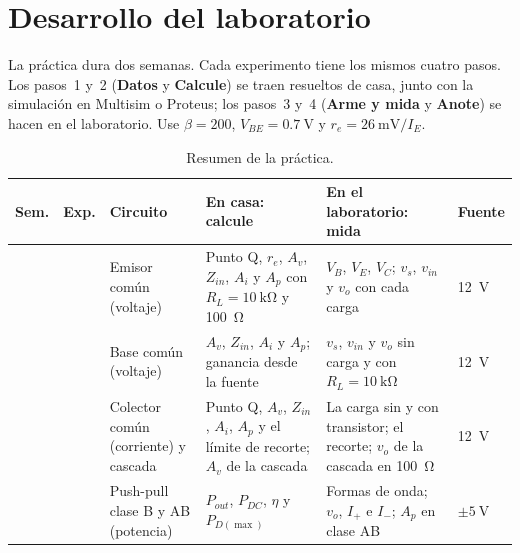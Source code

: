 \documentclass[11pt,a4paper]{article}
\let\needspace\Needspace
\begin{document}
\FloatBarrier
\needspace{14\baselineskip}
\section{Desarrollo del laboratorio}
La práctica dura dos semanas. Cada experimento tiene los mismos cuatro pasos. Los pasos~1 y~2
(\textbf{Datos} y \textbf{Calcule}) se traen resueltos de casa, junto con la simulación en
Multisim o Proteus; los pasos~3 y~4 (\textbf{Arme y mida} y \textbf{Anote}) se hacen en el
laboratorio. Use $\beta = 200$, $V_{BE} = \qty{0.7}{\volt}$ y
$r_e = \qty{26}{\milli\volt}/I_E$.

\begin{table}[H]
  \centering
  \renewcommand{\arraystretch}{1.35}
  \begin{tabularx}{\linewidth}{|>{\centering\arraybackslash}m{1.1cm}|>{\centering\arraybackslash}m{0.8cm}|>{\raggedright\arraybackslash}m{2.7cm}|>{\raggedright\arraybackslash}X|>{\raggedright\arraybackslash}X|>{\centering\arraybackslash}m{1.3cm}|}
    \hline
    \textbf{Sem.} & \textbf{Exp.} & \textbf{Circuito} & \textbf{En casa: calcule}
      & \textbf{En el laboratorio: mida} & \textbf{Fuente} \\ \hline
    \multirow{2}{*}{1} & 1 & Emisor común (voltaje)
      & Punto Q, $r_e$, $A_v$, $Z_{in}$, $A_i$ y $A_p$ con $R_L = \qty{10}{\kilo\ohm}$ y
        \qty{100}{\ohm}
      & $V_B$, $V_E$, $V_C$; $v_s$, $v_{in}$ y $v_o$ con cada carga
      & \qty{+12}{\volt} \\ \cline{2-6}
    & 2 & Base común (voltaje)
      & $A_v$, $Z_{in}$, $A_i$ y $A_p$; ganancia desde la fuente
      & $v_s$, $v_{in}$ y $v_o$ sin carga y con $R_L = \qty{10}{\kilo\ohm}$
      & \qty{+12}{\volt} \\ \hline
    \multirow{2}{*}{2} & 3 & Colector común (corriente) y cascada
      & Punto Q, $A_v$, $Z_{in}$, $A_i$, $A_p$ y el límite de recorte; $A_v$ de la cascada
      & La carga sin y con transistor; el recorte; $v_o$ de la cascada en \qty{100}{\ohm}
      & \qty{+12}{\volt} \\ \cline{2-6}
    & 4 & Push-pull clase B y AB (potencia)
      & $P_{out}$, $P_{DC}$, $\eta$ y $P_{D(\max)}$
      & Formas de onda; $v_o$, $I_+$ e $I_-$; $A_p$ en clase AB
      & $\pm\qty{5}{\volt}$ \\ \hline
  \end{tabularx}
  \caption{Resumen de la práctica.}
  \label{tab:resumen}
\end{table}
\end{document}
